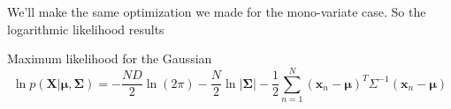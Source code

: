 \begin{frame}{\insertsubsection}
	We'll make the same optimization we made for the mono-variate case. So the logarithmic likelihood results 
	\begin{block}{Maximum likelihood for the Gaussian}
	\begin{equation*}
	\ln p \left( \mathbf{X} | \boldsymbol{\mu}, \boldsymbol{\Sigma} \right) =
	- \frac{N D}{2} \ln (2 \pi) - \frac{N}{2} \ln |\boldsymbol{\Sigma}| - 
	\frac{1}{2} \sum^N_{n=1} \left( \mathbf{x}_n - \boldsymbol{\mu} \right)^T 
	\Sigma^{-1} \left( \mathbf{x}_n - \boldsymbol{\mu} \right)
	\end{equation*}	
	\end{block}

\end{frame}


































